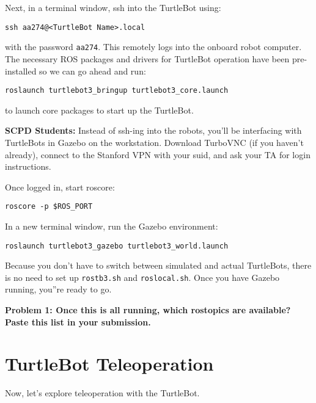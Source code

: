 \documentclass{article}
\begin{document}
Next, in a terminal window, ssh into the TurtleBot using:
\begin{lstlisting}
ssh aa274@<TurtleBot Name>.local
\end{lstlisting}

with the password \texttt{aa274}. This remotely logs into the onboard robot computer. The necessary ROS packages
and drivers for TurtleBot operation have been pre-installed so we can go ahead and run:

\begin{lstlisting}
roslaunch turtlebot3_bringup turtlebot3_core.launch	
\end{lstlisting}

to launch core packages to start up the TurtleBot.

\textbf{SCPD Students:} Instead of ssh-ing into the robots, you'll be interfacing with TurtleBots in Gazebo on the workstation. Download TurboVNC (if you haven't already), connect to the Stanford VPN with your suid, and ask your TA for login instructions.

Once logged in, start roscore:

\begin{lstlisting}
roscore -p $ROS_PORT
\end{lstlisting}

In a new terminal window, run the Gazebo environment:

\begin{lstlisting}
roslaunch turtlebot3_gazebo turtlebot3_world.launch
\end{lstlisting}

Because you don't have to switch between simulated and actual TurtleBots, there is no need to set up \texttt{rostb3.sh} and \texttt{roslocal.sh}. Once you have Gazebo running, you''re ready to go.

{\bf Problem 1: Once this is all running, which rostopics are available? Paste this list in your submission.}

\section{TurtleBot Teleoperation}

Now, let's explore teleoperation with the TurtleBot.
\end{document}
